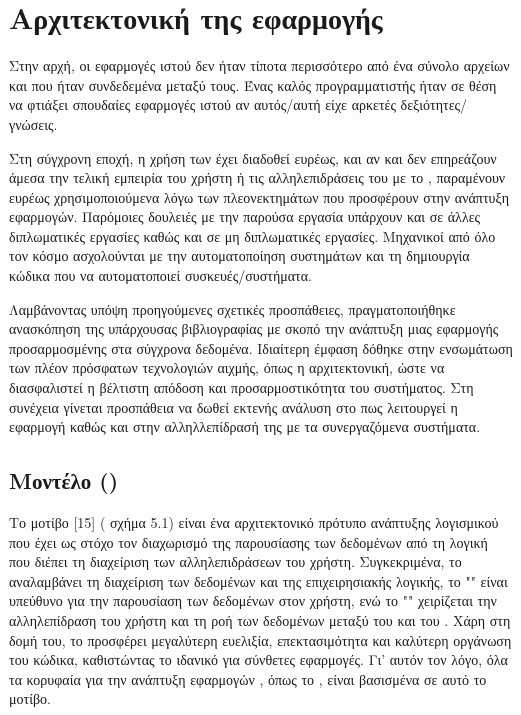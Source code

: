 \section{Αρχιτεκτονική της εφαρμογής}

Στην αρχή, οι εφαρμογές ιστού δεν ήταν τίποτα περισσότερο από ένα σύνολο αρχείων  και
 που ήταν συνδεδεμένα μεταξύ τους. Ένας καλός προγραμματιστής ήταν σε θέση να φτιάξει σπουδαίες εφαρμογές ιστού αν αυτός/αυτή
είχε αρκετές δεξιότητες/γνώσεις.

Στη σύγχρονη εποχή, η χρήση των  έχει διαδοθεί ευρέως, και αν και δεν επηρεάζουν άμεσα την τελική εμπειρία του χρήστη ή τις αλληλεπιδράσεις του με το , παραμένουν ευρέως χρησιμοποιούμενα λόγω των πλεονεκτημάτων που προσφέρουν στην ανάπτυξη εφαρμογών.
Παρόμοιες δουλειές με την παρούσα εργασία υπάρχουν και σε άλλες διπλωματικές εργασίες καθώς και σε μη διπλωματικές εργασίες. Μηχανικοί από όλο τον κόσμο
ασχολούνται με την αυτοματοποίηση συστημάτων και τη δημιουργία κώδικα που να αυτοματοποιεί συσκευές/συστήματα. 

Λαμβάνοντας υπόψη προηγούμενες σχετικές προσπάθειες, πραγματοποιήθηκε ανασκόπηση της υπάρχουσας βιβλιογραφίας με σκοπό την ανάπτυξη μιας εφαρμογής προσαρμοσμένης στα σύγχρονα δεδομένα. Ιδιαίτερη έμφαση δόθηκε στην ενσωμάτωση των πλέον πρόσφατων τεχνολογιών αιχμής, όπως η  αρχιτεκτονική, ώστε να διασφαλιστεί η βέλτιστη απόδοση και προσαρμοστικότητα του συστήματος. Στη συνέχεια γίνεται προσπάθεια να δωθεί εκτενής
ανάλυση στο πως λειτουργεί η εφαρμογή καθώς και στην αλληλλεπίδρασή της με τα συνεργαζόμενα συστήματα. 
 
\subsection{Μοντέλο  ()}

Το μοτίβο [15] ( σχήμα 5.1) είναι ένα αρχιτεκτονικό πρότυπο ανάπτυξης λογισμικού που έχει ως στόχο τον διαχωρισμό της παρουσίασης των δεδομένων από τη λογική που διέπει τη διαχείριση των αλληλεπιδράσεων του χρήστη. Συγκεκριμένα, το  αναλαμβάνει τη διαχείριση των δεδομένων και της επιχειρησιακής λογικής, το "" είναι υπεύθυνο για την παρουσίαση των δεδομένων στον χρήστη, ενώ το "" χειρίζεται την αλληλεπίδραση του χρήστη και τη ροή των δεδομένων μεταξύ του  και του .
Χάρη στη δομή του, το  προσφέρει μεγαλύτερη ευελιξία, επεκτασιμότητα και καλύτερη οργάνωση του κώδικα, καθιστώντας το ιδανικό για σύνθετες εφαρμογές. Γι’ αυτόν τον λόγο, όλα τα κορυφαία  για την ανάπτυξη εφαρμογών , όπως το , είναι βασισμένα σε αυτό το μοτίβο.


